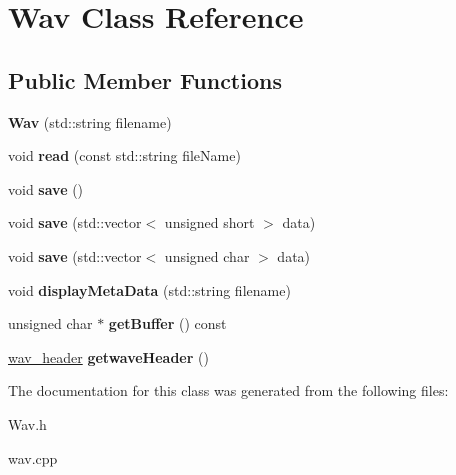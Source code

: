 \hypertarget{classWav}{}\section{Wav Class Reference}
\label{classWav}
\subsection*{Public Member Functions}
\begin{DoxyCompactItemize}
\item 
\mbox{\label{classWav_a2fee69ab4985c3a3a2a6688a758830e4}} 
{\bfseries Wav} (std\+::string filename)
\item 
\mbox{\label{classWav_a4d3a96a00149277de8280d6008a1ba4d}} 
void {\bfseries read} (const std\+::string file\+Name)
\item 
\mbox{\label{classWav_ab8ac2a53df386b529aa432ae3d3341bd}} 
void {\bfseries save} ()
\item 
\mbox{\label{classWav_ad5e4939d730ef4703200c7c0e0703936}} 
void {\bfseries save} (std\+::vector$<$ unsigned short $>$ data)
\item 
\mbox{\label{classWav_aeb77878ba667baec07e05531bae96453}} 
void {\bfseries save} (std\+::vector$<$ unsigned char $>$ data)
\item 
\mbox{\label{classWav_abe9ad7fffa63c476065c42b73ec157fb}} 
void {\bfseries display\+Meta\+Data} (std\+::string filename)
\item 
\mbox{\label{classWav_aa713fc552ec8d011df0acede14d23295}} 
unsigned char $\ast$ {\bfseries get\+Buffer} () const
\item 
\mbox{\label{classWav_aaa8d84c13c358e0b1390144c21b75645}} 
\hyperlink{structwav__header}{wav\+\_\+header} {\bfseries getwave\+Header} ()
\end{DoxyCompactItemize}


The documentation for this class was generated from the following files\+:\begin{DoxyCompactItemize}
\item 
Wav.\+h\item 
wav.\+cpp\end{DoxyCompactItemize}
